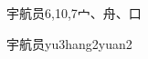 \begin{entry}{宇航员}{6,10,7}{⼧、⾈、⼝}
  \begin{phonetics}{宇航员}{yu3hang2yuan2}
  \end{phonetics}
\end{entry}
